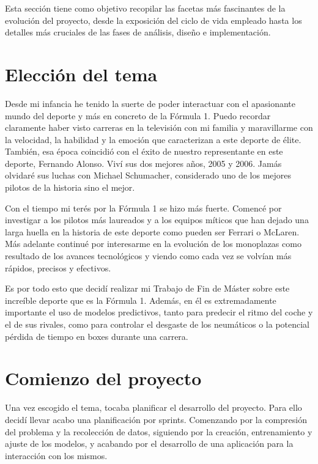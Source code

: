 
Esta sección tiene como objetivo recopilar las facetas más fascinantes de la evolución del proyecto, desde la exposición del ciclo de vida empleado hasta los detalles más cruciales de las fases de análisis, diseño e implementación.

\section{Elección del tema}

Desde mi infancia he tenido la suerte de poder interactuar con el apasionante mundo del deporte y más en concreto de la Fórmula 1. Puedo recordar claramente haber visto carreras en la televisión con mi familia y maravillarme con la velocidad, la habilidad y la emoción que caracterizan a este deporte de élite. También, esa época coincidió con el éxito de nuestro representante en este deporte, Fernando Alonso. Viví sus dos mejores años, 2005 y 2006. Jamás olvidaré sus luchas con Michael Schumacher, considerado uno de los mejores pilotos de la historia sino el mejor.

Con el tiempo mi terés por la Fórmula 1 se hizo más fuerte. Comencé por investigar a los pilotos más laureados y a los equipos míticos que han dejado una larga huella en la historia de este deporte como pueden ser Ferrari o McLaren. Más adelante continué por interesarme en la evolución de los monoplazas como resultado de los avances tecnológicos y viendo como cada vez se volvían más rápidos, precisos y efectivos.

Es por todo esto que decidí realizar mi Trabajo de Fin de Máster sobre este increíble deporte que es la Fórmula 1. Además, en él es extremadamente importante el uso de modelos predictivos, tanto para predecir el ritmo del coche y el de sus rivales, como para controlar el desgaste de los neumáticos o la potencial pérdida de tiempo en boxes durante una carrera.

\section{Comienzo del proyecto}

Una vez escogido el tema, tocaba planificar el desarrollo del proyecto. Para ello decidí llevar acabo una planificación por sprints. Comenzando por la compresión del problema y la recolección de datos, siguiendo por la creación, entrenamiento y ajuste de los modelos, y acabando por el desarrollo de una aplicación para la interacción con los mismos.


